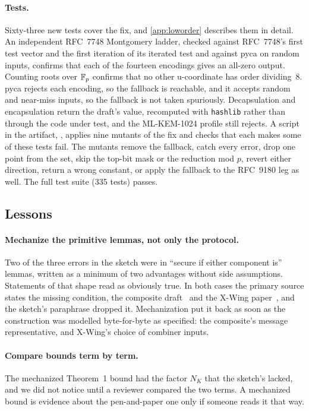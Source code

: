 \paragraph{Tests.} Sixty-three new tests cover the fix, and \cref{app:loworder}
describes them in detail. An independent RFC~7748 Montgomery ladder, checked
against RFC~7748's first test vector and the first iteration of its iterated
test and against pyca on random inputs, confirms that each of the fourteen
encodings gives an all-zero output. Counting roots over $\mathbb{F}_p$ confirms that
no other u-coordinate has order dividing~8. pyca rejects each encoding, so
the fallback is reachable, and it accepts random and near-miss inputs, so the
fallback is not taken spuriously. Decapsulation and encapsulation return the
draft's value, recomputed with \texttt{hashlib} rather than through the code
under test, and the ML-KEM-1024 profile still rejects. A script in the
artifact, , applies nine mutants of the fix
and checks that each makes some of these tests fail. The mutants remove the
fallback, catch every error, drop one point from the set, skip the top-bit
mask or the reduction mod $p$, revert either direction, return a wrong
constant, or apply the fallback to the RFC~9180 leg as well. The full test
suite (335 tests) passes.

\subsection{Lessons}\label{sec:lessons}

\paragraph{Mechanize the primitive lemmas, not only the protocol.} Two of
the three errors in the sketch were in ``secure if either component is''
lemmas, written as a minimum of two advantages without side assumptions.
Statements of that shape read as obviously true. In both cases the primary
source states the missing condition, the composite draft~\cite[\S1.3]{Composite}
and the X-Wing paper~\cite[Thm.~1]{XWing}, and the sketch's paraphrase
dropped it. Mechanization put it back as soon as the construction was
modelled byte-for-byte as specified: the composite's message representative,
and X-Wing's choice of combiner inputs.

\paragraph{Compare bounds term by term.} The mechanized Theorem~1 bound had
the factor $N_K$ that the sketch's lacked, and we did not notice until a
reviewer compared the two terms. A mechanized bound is evidence about the
pen-and-paper one only if someone reads it that way.

